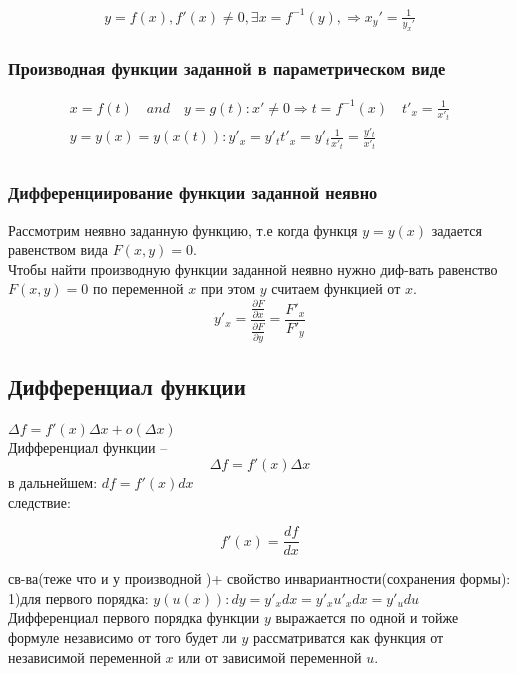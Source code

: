 \documentclass[a4paper, 12pt]{article}
\begin{document}
\begin{align}
  y = f(x),f'(x)\neq 0,\exists x=f^{-1}(y),\Rightarrow x_y' = \frac{1}{y_x'}
\end{align}

\subsubsection{Производная функции заданной в параметрическом виде}

\begin{align*}
  x = f(t) \quad and \quad y = g(t): x' \neq 0 \Rightarrow t = f^{-1}(x) \quad  t'_x = \frac{1}{x'_t}\\
  y = y(x) = y(x(t)) :  y'_x = y'_t  t'_x=y'_t  \frac{1}{x'_t} = \frac{y'_t}{x'_t}\\
\end{align*}


\subsubsection{Дифференциирование функции заданной неявно}

Рассмотрим неявно заданную функцию, т.е когда функця  $ y = y(x)  $ задается равенством вида $ F(x,y) = 0 $.\\
Чтобы найти производную функции заданной неявно нужно диф-вать равенство $ F(x,y) = 0 $ по переменной $ x $ при этом $ y $ считаем функцией от $ x $.\\

\[
        y'_x = \frac{\frac{\partial F}{\partial x}}{\frac{\partial F}{\partial y}} = \frac{F'_x}{F'_y}
      \]      

\subsection{Дифференциал функции}

$ \Delta f = f'(x) \Delta x + o(\Delta x) $\\

Дифференциал функции -- \[
  \Delta f = f'(x) \Delta x
\]
в дальнейшем: $ df = f'(x) dx $\\
следствие:

\[
  f'(x) = \frac{df}{dx}   
 \] 

св-ва(теже что и у производной )+ свойство инвариантности(сохранения формы):\\
1)для первого порядка: $ y(u(x)): dy = y'_x dx=y'_x u'_x dx = y'_u du $ \\
Дифференциал первого порядка функции $ y $  выражается по одной и тойже формуле независимо от того будет ли $ y $ рассматриватся как функция от независимой переменной $ x $ или от зависимой переменной $ u $.\\
\end{document}

